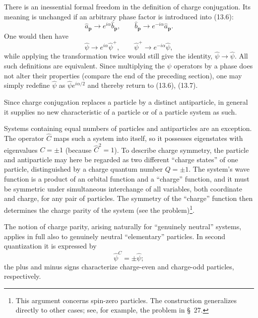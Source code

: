 There is an inessential formal freedom in the definition of charge conjugation. Its meaning is unchanged if an arbitrary phase factor is introduced into (13.6):
\[
\widehat a_{\mathbf{p}}\to e^{i\alpha}\widehat b_{\mathbf{p}},
\qquad
\widehat b_{\mathbf{p}}\to e^{-i\alpha}\widehat a_{\mathbf{p}}.
\]
One would then have
\[
\widehat\psi\to e^{i\alpha}\widehat\psi^+,
\qquad
\widehat\psi^+\to e^{-i\alpha}\widehat\psi,
\]
while applying the transformation twice would still give the identity, $\widehat\psi\to\widehat\psi$. All such definitions are equivalent. Since multiplying the $\psi$ operators by a phase does not alter their properties (compare the end of the preceding section), one may simply redefine $\widehat\psi$ as $\widehat\psi e^{i\alpha/2}$ and thereby return to (13.6), (13.7).

Since charge conjugation replaces a particle by a distinct antiparticle, in general it supplies no new characteristic of a particle or of a particle system as such.

Systems containing equal numbers of particles and antiparticles are an exception. The operator $\widehat C$ maps such a system into itself, so it possesses eigenstates with eigenvalues $C=\pm1$ (because $\widehat C^2=1$). To describe charge symmetry, the particle and antiparticle may here be regarded as two different ``charge states'' of one particle, distinguished by a charge quantum number $Q=\pm1$. The system's wave function is a product of an orbital function and a ``charge'' function, and it must be symmetric under simultaneous interchange of all variables, both coordinate and charge, for any pair of particles. The symmetry of the ``charge'' function then determines the charge parity of the system (see the problem)\footnote{This argument concerns spin-zero particles. The construction generalizes directly to other cases; see, for example, the problem in \S~27.}.

The notion of charge parity, arising naturally for ``genuinely neutral'' systems, applies in full also to genuinely neutral ``elementary'' particles. In second quantization it is expressed by
\begin{equation}
\widehat\psi^C=\pm\widehat\psi;
\tag{13.8}
\end{equation}
the plus and minus signs characterize charge-even and charge-odd particles, respectively.

